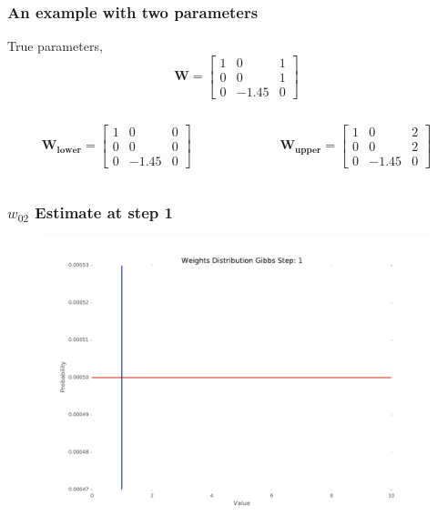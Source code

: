\documentclass{beamer}
\begin{document}
\begin{frame}
\frametitle{An example with two parameters}
True parameters,
\[
\mathbf{W}=\left[\begin{array}{ccc}
1 & 0 & 1\\
0 & 0 & 1\\
0 & -1.45 & 0
\end{array}\right]
\]

\begin{columns}
\begin{column}{0.5\textwidth}

\[
\mathbf{W_{lower}}=\left[\begin{array}{ccc}
1 & 0 & 0\\
0 & 0 & 0\\
0 & -1.45 & 0
\end{array}\right]
\]

\end{column}
\begin{column}{0.5\textwidth}  %

\[
\mathbf{W_{upper}}=\left[\begin{array}{ccc}
1 & 0 & 2\\
0 & 0 & 2\\
0 & -1.45 & 0
\end{array}\right]
\]

\end{column}
\end{columns}
\end{frame}

\begin{frame}
\frametitle{$w_{02}$ Estimate at step 1}
\begin{figure}
\includegraphics[width=0.8\linewidth]{figs/1_WeDistr}
\end{figure}
\end{frame}
\end{document}
